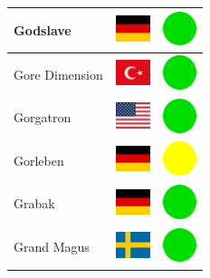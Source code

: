 \documentclass[12pt, a4paper, twoside]{report}
\begin{document}
\begin{center}
\begin{longtable}{|p{5cm}|p{2cm}|p{2cm}|}
Godslave & \includegraphics[width=1cm]{4x3/de} & \includegraphics[width=1cm]{likes/y} \\ \hline
Gore Dimension & \includegraphics[width=1cm]{4x3/tr} & \includegraphics[width=1cm]{likes/y} \\ \hline
Gorgatron & \includegraphics[width=1cm]{4x3/us} & \includegraphics[width=1cm]{likes/y} \\ \hline
Gorleben & \includegraphics[width=1cm]{4x3/de} & \includegraphics[width=1cm]{likes/m} \\ \hline
Grabak & \includegraphics[width=1cm]{4x3/de} & \includegraphics[width=1cm]{likes/y} \\ \hline
Grand Magus & \includegraphics[width=1cm]{4x3/se} & \includegraphics[width=1cm]{likes/y} \\ \hline

\end{longtable}
\end{center}
\end{document}
